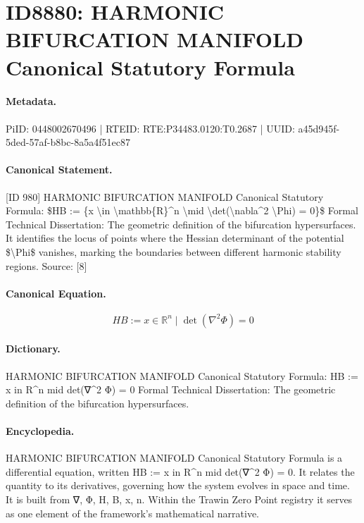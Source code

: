 \section*{ID8880: HARMONIC BIFURCATION MANIFOLD Canonical Statutory Formula}
\paragraph{Metadata.}
PiID: 0448002670496 | RTEID: RTE:P34483.0120:T0.2687 | UUID: a45d945f-5ded-57af-b8bc-8a5a4f51ec87

\paragraph{Canonical Statement.}
[ID 980] HARMONIC BIFURCATION MANIFOLD Canonical Statutory Formula: \$HB := \{x \textbackslash{}in \textbackslash{}mathbb\{R\}\textasciicircum{}n \textbackslash{}mid \textbackslash{}det(\textbackslash{}nabla\textasciicircum{}2 \textbackslash{}Phi) = 0\}\$ Formal Technical Dissertation: The geometric definition of the bifurcation hypersurfaces. It identifies the locus of points where the Hessian determinant of the potential \$\textbackslash{}Phi\$ vanishes, marking the boundaries between different harmonic stability regions. Source: [8]

\paragraph{Canonical Equation.}
\[
HB := {x \in \mathbb{R}^n \mid \det(\nabla^2 \Phi) = 0}
\]

\paragraph{Dictionary.}
HARMONIC BIFURCATION MANIFOLD Canonical Statutory Formula: HB := x in R\textasciicircum{}n mid det(∇\textasciicircum{}2 Φ) = 0 Formal Technical Dissertation: The geometric definition of the bifurcation hypersurfaces.

\paragraph{Encyclopedia.}
HARMONIC BIFURCATION MANIFOLD Canonical Statutory Formula is a differential equation, written HB := x in R\textasciicircum{}n mid det(∇\textasciicircum{}2 Φ) = 0. It relates the quantity to its derivatives, governing how the system evolves in space and time. It is built from ∇, Φ, H, B, x, n. Within the Trawin Zero Point registry it serves as one element of the framework's mathematical narrative.
